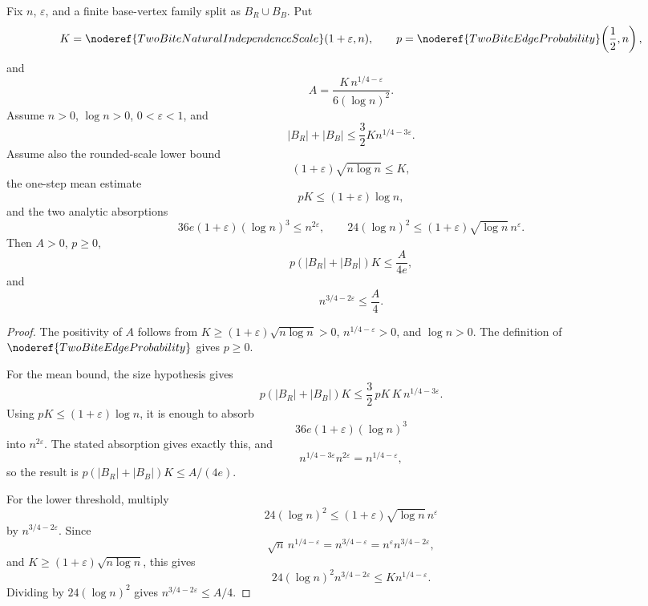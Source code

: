 \begin{lemma}
Fix \(n\), \(\varepsilon\), and a finite base-vertex family split as
\(B_R\cup B_B\).  Put
\[
K=\noderef{TwoBiteNaturalIndependenceScale}(1+\varepsilon,n),\qquad
p=\noderef{TwoBiteEdgeProbability}\!\left(\frac12,n\right),
\]
and
\[
A=\frac{K\,n^{1/4-\varepsilon}}{6(\log n)^2}.
\]
Assume \(n>0\), \(\log n>0\), \(0<\varepsilon<1\), and
\[
|B_R|+|B_B|
\le \frac32 K n^{1/4-3\varepsilon}.
\]
Assume also the rounded-scale lower bound
\[
(1+\varepsilon)\sqrt{n\log n}\le K,
\]
the one-step mean estimate
\[
pK\le (1+\varepsilon)\log n,
\]
and the two analytic absorptions
\[
36e(1+\varepsilon)(\log n)^3\le n^{2\varepsilon},
\qquad
24(\log n)^2\le (1+\varepsilon)\sqrt{\log n}\,n^\varepsilon.
\]
Then \(A>0\), \(p\ge0\),
\[
p(|B_R|+|B_B|)K\le \frac{A}{4e},
\]
and
\[
n^{3/4-2\varepsilon}\le \frac A4.
\]
\end{lemma}
\begin{proof}
The positivity of \(A\) follows from \(K\ge(1+\varepsilon)\sqrt{n\log n}>0\),
\(n^{1/4-\varepsilon}>0\), and \(\log n>0\).  The definition of
\(\noderef{TwoBiteEdgeProbability}\) gives \(p\ge0\).

For the mean bound, the size hypothesis gives
\[
p(|B_R|+|B_B|)K
\le \frac32\,pK\,K\,n^{1/4-3\varepsilon}.
\]
Using \(pK\le(1+\varepsilon)\log n\), it is enough to absorb
\[
36e(1+\varepsilon)(\log n)^3
\]
into \(n^{2\varepsilon}\).  The stated absorption gives exactly this, and
\[
n^{1/4-3\varepsilon}n^{2\varepsilon}=n^{1/4-\varepsilon},
\]
so the result is \(p(|B_R|+|B_B|)K\le A/(4e)\).

For the lower threshold, multiply
\[
24(\log n)^2\le (1+\varepsilon)\sqrt{\log n}\,n^\varepsilon
\]
by \(n^{3/4-2\varepsilon}\).  Since
\[
\sqrt n\,n^{1/4-\varepsilon}=n^{3/4-\varepsilon}
=n^\varepsilon n^{3/4-2\varepsilon},
\]
and \(K\ge(1+\varepsilon)\sqrt{n\log n}\), this gives
\[
24(\log n)^2 n^{3/4-2\varepsilon}
\le K n^{1/4-\varepsilon}.
\]
Dividing by \(24(\log n)^2\) gives \(n^{3/4-2\varepsilon}\le A/4\).
\end{proof}
